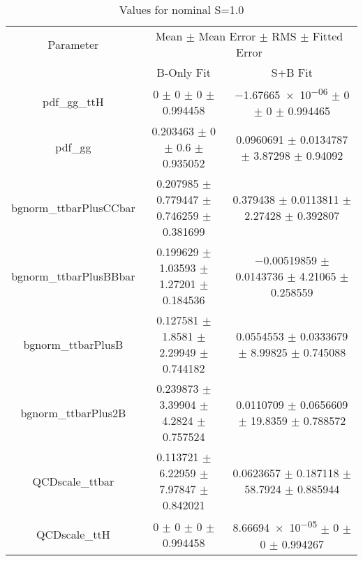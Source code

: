 \begin{table}
\centering
\caption{Values for nominal S=1.0}
\begin{tabular}{ccc}
\toprule
Parameter & \multicolumn{2}{c}{Mean $\pm$ Mean Error $\pm$ RMS $\pm$ Fitted Error}\\
 & B-Only Fit & S+B Fit\\
\midrule
pdf\_gg\_ttH & \num{0} $\pm$ \num{0} $\pm$ \num{0} $\pm$ \num{0.994458} & \num{-1.67665e-06} $\pm$ \num{0} $\pm$ \num{0} $\pm$ \num{0.994465}\\
pdf\_gg & \num{0.203463} $\pm$ \num{0} $\pm$ \num{0.6} $\pm$ \num{0.935052} & \num{0.0960691} $\pm$ \num{0.0134787} $\pm$ \num{3.87298} $\pm$ \num{0.94092}\\
bgnorm\_ttbarPlusCCbar & \num{0.207985} $\pm$ \num{0.779447} $\pm$ \num{0.746259} $\pm$ \num{0.381699} & \num{0.379438} $\pm$ \num{0.0113811} $\pm$ \num{2.27428} $\pm$ \num{0.392807}\\
bgnorm\_ttbarPlusBBbar & \num{0.199629} $\pm$ \num{1.03593} $\pm$ \num{1.27201} $\pm$ \num{0.184536} & \num{-0.00519859} $\pm$ \num{0.0143736} $\pm$ \num{4.21065} $\pm$ \num{0.258559}\\
bgnorm\_ttbarPlusB & \num{0.127581} $\pm$ \num{1.8581} $\pm$ \num{2.29949} $\pm$ \num{0.744182} & \num{0.0554553} $\pm$ \num{0.0333679} $\pm$ \num{8.99825} $\pm$ \num{0.745088}\\
bgnorm\_ttbarPlus2B & \num{0.239873} $\pm$ \num{3.39904} $\pm$ \num{4.2824} $\pm$ \num{0.757524} & \num{0.0110709} $\pm$ \num{0.0656609} $\pm$ \num{19.8359} $\pm$ \num{0.788572}\\
QCDscale\_ttbar & \num{0.113721} $\pm$ \num{6.22959} $\pm$ \num{7.97847} $\pm$ \num{0.842021} & \num{0.0623657} $\pm$ \num{0.187118} $\pm$ \num{58.7924} $\pm$ \num{0.885944}\\
QCDscale\_ttH & \num{0} $\pm$ \num{0} $\pm$ \num{0} $\pm$ \num{0.994458} & \num{8.66694e-05} $\pm$ \num{0} $\pm$ \num{0} $\pm$ \num{0.994267}\\
\bottomrule
\end{tabular}
\end{table}